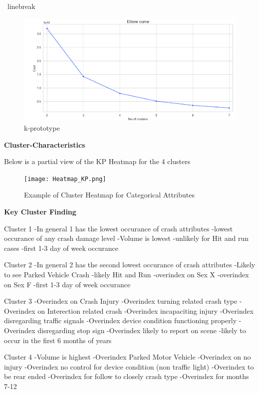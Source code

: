 \documentclass[conference]{IEEEtran}
\begin{document}
\begin{center}
\ linebreak
 \begin{figure}[!h]
	\includegraphics[width=\linewidth]{KPrototype_Elbow.png}
	\caption{k-prototype}
	\label{fig: kprototype elbow chart}
 \end{figure}

\textbf{Cluster-Characteristics} \linebreak

Below is a partial view of the KP Heatmap for the 4 clusters

\begin{figure}[!h]
	\texttt{[image: Heatmap\_KP.png]}
	\caption{Example of Cluster Heatmap for Categorical Attributes }
	\label{fig: Cluster Heatmap for Categorical Attributes (4 Clusters)}
\end{figure}

\begin{center} 
	\textbf{Key Cluster Finding} 
	\end{center}
	
Cluster 1
-In general 1 has the lowest occurance of crash attributes
-lowest occurance of any crash damage level
-Volume is lowest
-unlikely for Hit and run cases
-first 1-3 day of week occurance

Cluster 2
-In general 2 has the second lowest occurance of crash attributes
-Likely to see Parked Vehicle Crash
-likely Hit and Run
-overindex on Sex X
-overindex on Sex F
-first 1-3 day of week occurance

Cluster 3
-Overindex on Crash Injury
-Overindex turning related crash type
-Overindex on Interection related crash
-Overindex incapaciting injury
-Overindex disregarding traffic signals
-Overindex device condition functioning properly
-Overindex disregarding stop sign
-Overindex likely to report on scene
-likely to occur in the first 6 months of years

Cluster 4
-Volume is highest
-Overindex Parked Motor Vehicle
-Overindex on no injury
-Overindex no control for device condition (non traffic light)
-Overindex to be rear ended
-Overindex for follow to closely crash type
-Overindex for months 7-12




\end{center}
\end{document}
